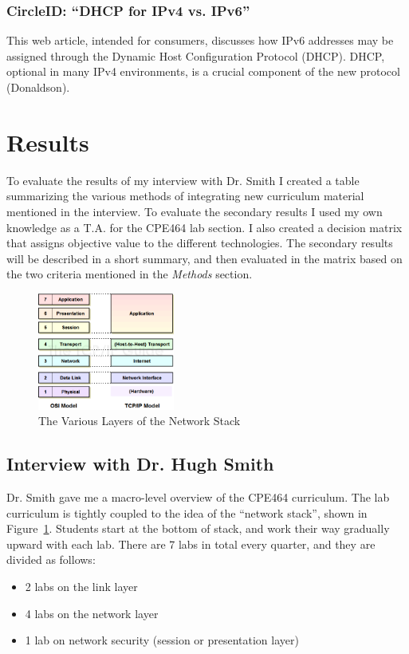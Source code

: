 \documentclass[12pt]{article}
\begin{document}
\subsubsection{CircleID: ``DHCP for IPv4 vs. IPv6''}
This web article, intended for consumers, discusses how IPv6 addresses may be assigned through the Dynamic Host Configuration Protocol (DHCP). DHCP, optional in many IPv4 environments, is a crucial component of the new protocol (Donaldson).

\section{Results}
To evaluate the results of my interview with Dr. Smith I created a table summarizing the various methods of integrating new curriculum material mentioned in the interview. To evaluate the secondary results I used my own knowledge as a T.A. for the CPE464 lab section. I also created a decision matrix that assigns objective value to the different technologies. The secondary results will be described in a short summary, and then evaluated in the matrix based on the two criteria mentioned in the \textit{Methods} section.

\begin{figure}[ht!]
  \centering
  \includegraphics[width=0.4\textwidth]{the_stack.png}
  \caption{The Various Layers of the Network Stack}
  \label{fig:the_stack}
\end{figure}

\subsection{Interview with Dr. Hugh Smith}
Dr. Smith gave me a macro-level overview of the CPE464 curriculum. The lab curriculum is tightly coupled to the idea of the ``network stack'', shown in Figure~\ref{fig:the_stack}. Students start at the bottom of stack, and work their way gradually upward with each lab. There are 7 labs in total every quarter, and they are divided as follows:
\begin{itemize}
\item 2 labs on the link layer
\item 4 labs on the network layer
\item 1 lab on network security (session or presentation layer)
\end{itemize}
\end{document}
